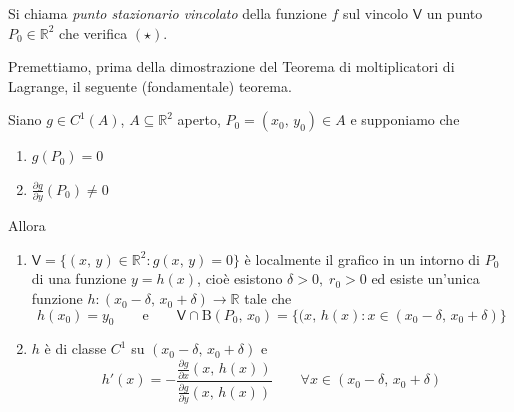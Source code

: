 \begin{definition}
Si chiama \emph{punto stazionario vincolato} della funzione $f$ sul vincolo $\mathsf{V}$ un punto $P_0 \in\mathbb{R}^2$ che verifica $\mathrm{(\star)}$.
\end{definition}

Premettiamo, prima della dimostrazione del Teorema di moltiplicatori di Lagrange, il seguente (fondamentale) teorema.

\begin{thm}
Siano $g \in C^1(A)$, $A \subseteq \mathbb{R}^2$ aperto, $P_0 = (x_0,\,y_0) \in A$ e supponiamo che
\begin{enumerate}[labelindent=\parindent,leftmargin=*,label=\textnormal{(\roman*)},start=1]
\item $g(P_0) = 0$
\item $\displaystyle \frac{\partial g}{\partial y}(P_0) \neq 0$
\end{enumerate}
Allora
\begin{enumerate}[labelindent=\parindent,leftmargin=*,label=\textnormal{(D\arabic*)},start=1]
\item $\mathsf{V} = \lbrace (x,\,y) \in \mathbb{R}^2 : g(x,\,y) = 0 \rbrace$ è localmente il grafico in un intorno di $P_0$ di una funzione $y = h(x)$, cioè esistono $\delta > 0,\; r_0 > 0$ ed esiste un'unica funzione $h : (x_0 - \delta,\, x_0 + \delta) \longrightarrow \mathbb{R}$ tale che
$$
h(x_0) = y_0
\qquad \text{e} \qquad 
\mathsf{V} \cap \mathrm{B}(P_0,\,x_0) = \lbrace (x,\,h(x) : x \in (x_0 - \delta,\, x_0 + \delta) \rbrace
$$
\item $h$ è di classe $C^1$ su $(x_0 - \delta,\, x_0 + \delta)$ e
$$
h'(x) = - \frac{\displaystyle \frac{\partial g}{\partial x} \left( x,\,h(x) \right)}{\displaystyle \frac{\partial g}{\partial y} \left( x,\,h(x) \right)}
\qquad \forall x \in (x_0 - \delta,\, x_0 + \delta)
$$
\end{enumerate}
\end{thm}

